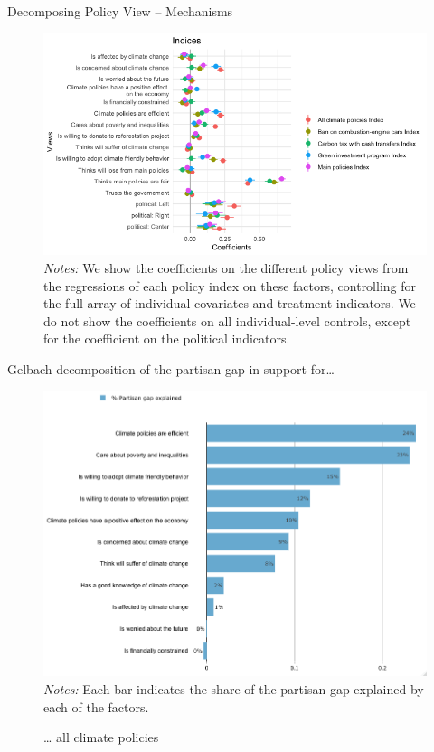 \begin{frame}{Decomposing Policy View -- Mechanisms}%
\begin{figure}[h!]
\includegraphics[width=.9\textwidth]{../../figures/Gelbach/coef_policy_views_indices_all} \\
{\tiny \textit{Notes:} We show the coefficients on the different policy views from the regressions of each policy index on these factors, controlling for the full array of individual covariates and treatment indicators. We do not show the coefficients on all individual-level controls, except for the coefficient on the political indicators.}
\end{figure}
\end{frame}

\begin{frame}{Gelbach decomposition of the partisan gap in support for…}%
\vspace{-.2cm}
\begin{figure}[h!]
\caption{… all climate policies}
\includegraphics[width=.65\textwidth]{../../figures/Gelbach/gelbach_right_all_policies_D2SD} \\
{\tiny \textit{Notes:} Each bar indicates the share of the partisan gap explained by each of the factors.}
\end{figure}
\end{frame}

